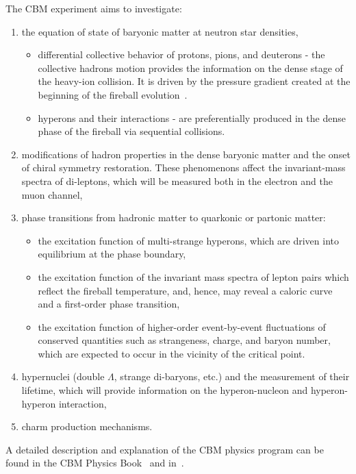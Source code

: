 The \gls{CBM} experiment aims to investigate:
\begin{enumerate}
    \item the equation of state of baryonic matter at neutron star densities,
    \begin{itemize}
        \item differential collective behavior of protons, pions, and deuterons - the collective hadrons motion provides the information on the dense stage of the heavy-ion collision. It is driven by the pressure gradient created at the beginning of the fireball evolution~\cite{Reisdorf_2007}.
        \item hyperons and their interactions - are preferentially produced in the dense phase of the fireball via sequential collisions.
    \end{itemize}
    \item modifications of hadron properties in the dense baryonic matter and the onset of chiral symmetry restoration. These phenomenons affect the invariant-mass spectra of di-leptons, which will be measured both in the electron and the muon channel,
    \item phase transitions from hadronic matter to quarkonic or partonic matter:
    \begin{itemize}
        \item the excitation function of multi-strange hyperons, which are driven into equilibrium at the phase boundary,
        \item the excitation function of the invariant mass spectra of lepton pairs which reflect the fireball temperature, and, hence, may reveal a caloric curve and a first-order phase transition,
        \item the excitation function of higher-order event-by-event fluctuations of conserved quantities such as strangeness, charge, and baryon number, which are expected to occur in the vicinity of the critical point.
    \end{itemize}
    \item hypernuclei (double $\Lambda$, strange di-baryons, etc.) and the measurement of their lifetime, which will provide information on the hyperon-nucleon and hyperon-hyperon interaction,
    \item charm production mechanisms.
\end{enumerate}
A detailed description and explanation of the \gls{CBM} physics program can be found in the \gls{CBM} Physics Book~\cite{CBM_physics} and in~\cite{Ablyazimov_2017}.



